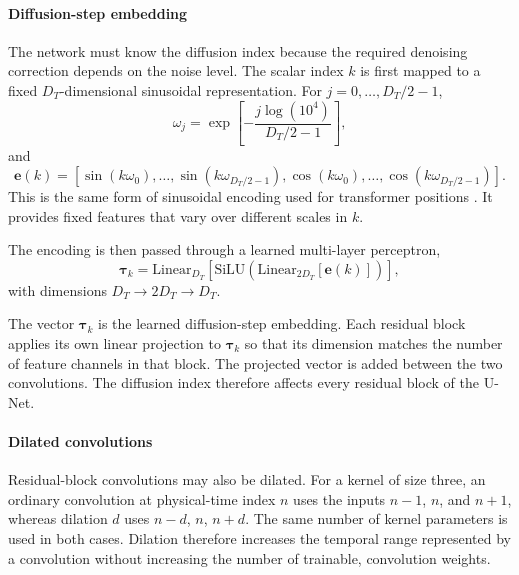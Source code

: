\paragraph{Diffusion-step embedding}

The network must know the diffusion index because the required denoising
correction depends on the noise level. The scalar index $k$ is first mapped to a
fixed $D_T$-dimensional sinusoidal representation. For
$j=0,\ldots,D_T/2-1$,
\begin{equation}
    \omega_j
    =
    \exp\left[
        -\frac{
            j\log(10^4)
        }{
            D_T/2-1
        }
    \right],
\end{equation}
and
\begin{equation}
    \mathbf{e}(k)
    =
    \left[
        \sin(k\omega_0),
        \ldots,
        \sin(k\omega_{D_T/2-1}),
        \cos(k\omega_0),
        \ldots,
        \cos(k\omega_{D_T/2-1})
    \right].
    \label{eq:diffusion_step_encoding}
\end{equation}
This is the same form of sinusoidal encoding used for transformer positions
\cite{vaswani2017attention}. It provides fixed features that vary over different
scales in $k$.

The encoding is then passed through a learned multi-layer perceptron,
\begin{equation}
    \boldsymbol{\tau}_k
    =
    \mathrm{Linear}_{D_T}
    \left[
        \mathrm{SiLU}
        \left(
            \mathrm{Linear}_{2D_T}
            [\mathbf{e}(k)]
        \right)
    \right],
    \label{eq:diffusion_step_embedding}
\end{equation}
with dimensions $D_T \to 2D_T \to D_T$.

The vector $\boldsymbol{\tau}_k$ is the learned diffusion-step embedding. Each residual block applies its own linear projection to $\boldsymbol{\tau}_k$ so that its dimension matches the number of feature channels in that block. The projected vector is added between the two convolutions. The diffusion index therefore affects every residual block of the U-Net.

\paragraph{Dilated convolutions}

Residual-block convolutions may also be dilated. For a kernel of size three, an ordinary convolution at physical-time index $n$ uses the inputs $n-1$, $n$, and $n+1$, whereas dilation $d$ uses $n-d$, $n$, $n+d$. The same number of kernel parameters is used in both cases. Dilation therefore increases the temporal range represented by a convolution without increasing the number of trainable, convolution weights.

